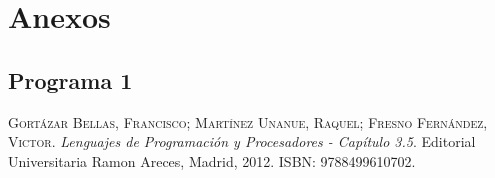\documentclass{article}
\begin{document}
\newpage
\section{Anexos}

\subsection{Programa 1}
\label{sub:a11}


\newpage
\begin{thebibliography}{99}
	\textsc{Gort\'azar Bellas, Francisco; Mart\'inez Unanue, Raquel; Fresno Fern\'andez, Victor}. \textit{Lenguajes de Programaci\'on y Procesadores - Cap\'itulo 3.5}. Editorial Universitaria Ramon Areces, Madrid, 2012. \textsc{ISBN: 9788499610702}.
\end{thebibliography}
\end{document}
